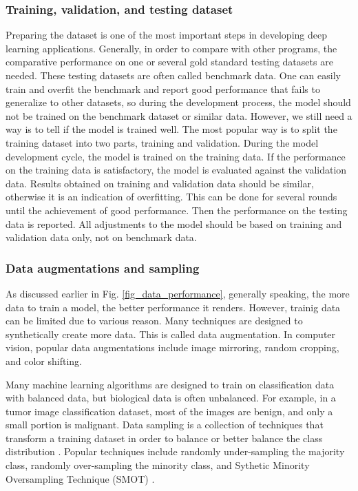 \subsubsection{Training, validation, and testing dataset}
Preparing the dataset is one of the most important steps in developing deep learning applications. Generally, in order to compare with other programs, the comparative performance on one or several gold standard testing datasets are needed. These testing datasets are often called benchmark data. One can easily train and overfit the benchmark and report good performance that fails to generalize to other datasets, so during the development process, the model should not be trained on the benchmark dataset or similar data. However, we still need a way is to tell if the model is trained well. The most popular way is to split the training dataset into two parts, training and validation. During the model development cycle, the model is trained on the training data. If the performance on the training data is satisfactory, the model is evaluated against the validation data. Results obtained on training and validation data should be similar, otherwise it is an indication of overfitting. This can be done for several rounds until the achievement of good performance. Then the performance on the testing data is reported. All adjustments to the model should be based on training and validation data only, not on benchmark data.
\subsubsection{Data augmentations and sampling}
As discussed earlier in Fig. \ref{fig_data_performance}, generally speaking, the more data to train a model, the better performance it renders. However, trainig data can be limited due to various reason. Many techniques are designed to synthetically create more data. This is called data augmentation. In computer vision, popular data augmentations include image mirroring, random cropping, and color shifting.  

Many machine learning algorithms are designed to train on classification data with balanced data, but biological data is often unbalanced. For example, in a tumor image classification dataset, most of the images are benign, and only a small portion is malignant. Data sampling is a collection of techniques that transform a training dataset in order to balance or better balance the class distribution \cite{chawla2004special}. Popular techniques include randomly under-sampling the majority class, randomly over-sampling the minority class, and Sythetic Minority Oversampling Technique (SMOT) \cite{chawla2002smote}.
